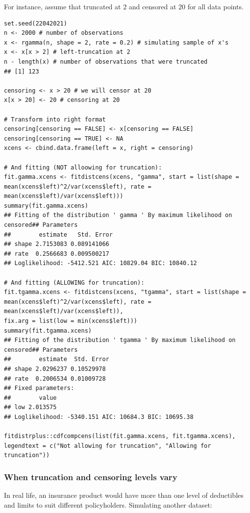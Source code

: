 \documentclass[11pt]{article}
\newcommand{\noi}{\noindent}
\begin{document}
\noi For instance, assume that truncated at $2$ and censored at $20$ for all data points.

\begin{lstlisting}
set.seed(22042021)
n <- 2000 # number of observations
x <- rgamma(n, shape = 2, rate = 0.2) # simulating sample of x's
x <- x[x > 2] # left-truncation at 2
n - length(x) # number of observations that were truncated
## [1] 123

censoring <- x > 20 # we will censor at 20
x[x > 20] <- 20 # censoring at 20

# Transform into right format
censoring[censoring == FALSE] <- x[censoring == FALSE]
censoring[censoring == TRUE] <- NA
xcens <- cbind.data.frame(left = x, right = censoring)

# And fitting (NOT alloowing for truncation):
fit.gamma.xcens <- fitdistcens(xcens, "gamma", start = list(shape =                                 mean(xcens$left)^2/var(xcens$left), rate = mean(xcens$left)/var(xcens$left)))
summary(fit.gamma.xcens)
## Fitting of the distribution ' gamma ' By maximum likelihood on censored## Parameters
##        estimate   Std. Error
## shape 2.7153083 0.089141066
## rate  0.2566683 0.009500217
## Loglikelihood: -5412.521 AIC: 10829.04 BIC: 10840.12

# And fitting (ALLOWING for truncation):
fit.tgamma.xcens <- fitdistcens(xcens, "tgamma", start = list(shape =                               mean(xcens$left)^2/var(xcens$left), rate = mean(xcens$left)/var(xcens$left)),
fix.arg = list(low = min(xcens$left)))
summary(fit.tgamma.xcens)
## Fitting of the distribution ' tgamma ' By maximum likelihood on censored## Parameters
##        estimate  Std. Error
## shape 2.0296237 0.10529978
## rate  0.2006534 0.01009728
## Fixed parameters:
##        value
## low 2.013575
## Loglikelihood: -5340.151 AIC: 10684.3 BIC: 10695.38

fitdistrplus::cdfcompcens(list(fit.gamma.xcens, fit.tgamma.xcens),
legendtext = c("Not allowing for truncation", "Allowing for truncation"))
\end{lstlisting}

\subsubsection{When truncation and censoring levels vary}
\noi In real life, an insurance product would have more than one level of
deductibles and limits to suit different policyholders. Simulating another
dataset:
\end{document}
